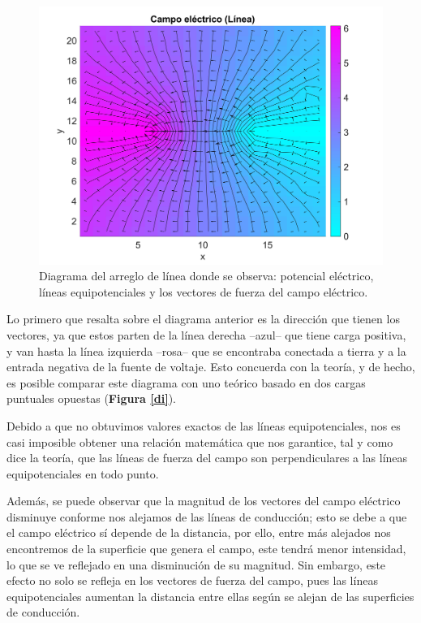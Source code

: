 \documentclass[letterpaper, 11 pt]{article}
\begin{document}
\begin{multicols}{2}
\begin{figure}[H]
    \centering
    \includegraphics[scale=0.05]{finaldipolo.jpg}
    \captionsetup{justification=centering,margin=0.5cm}
    \caption{Diagrama del arreglo de línea donde se observa: potencial eléctrico, líneas equipotenciales y los vectores de fuerza del campo eléctrico.}
    \label{camp}
\end{figure}

Lo primero que resalta sobre el diagrama anterior es la dirección que tienen los vectores, ya que estos parten de la línea derecha --azul-- que tiene carga positiva, y van hasta la línea izquierda --rosa-- que se encontraba conectada a tierra y a la entrada negativa de la fuente de voltaje. Esto concuerda con la teoría, y de hecho, es posible comparar este diagrama con uno teórico basado en dos cargas puntuales opuestas (\textbf{Figura \ref{di}}). 

Debido a que no obtuvimos valores exactos de las líneas equipotenciales, nos es casi imposible obtener una relación matemática que nos garantice, tal y como dice la teoría, que las líneas de fuerza del campo son perpendiculares a las líneas equipotenciales en todo punto.


Además, se puede observar que la magnitud de los vectores del campo eléctrico disminuye conforme nos alejamos de las líneas de conducción; esto se debe a que el campo eléctrico sí depende de la distancia, por ello, entre más alejados nos encontremos de la superficie que genera el campo, este tendrá menor intensidad, lo que se ve reflejado en una disminución de su magnitud. Sin embargo, este efecto no solo se refleja en los vectores de fuerza del campo, pues las líneas equipotenciales aumentan la distancia entre ellas según se alejan de las superficies de conducción. 



\end{multicols}
\end{document}
